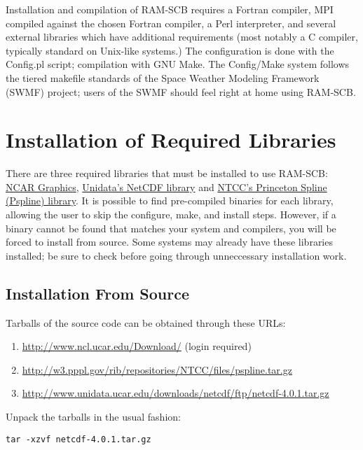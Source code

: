 Installation and compilation of RAM-SCB requires a Fortran compiler, MPI 
compiled against the chosen Fortran compiler, a Perl interpreter, and several 
external libraries which have additional requirements (most notably a C 
compiler, typically standard on Unix-like systems.)  The configuration is 
done with the Config.pl script; compilation with GNU Make.  The Config/Make 
system follows the tiered makefile standards of the Space Weather Modeling 
Framework (SWMF) project; users of the SWMF should feel right at home using
RAM-SCB.

\section{Installation of Required Libraries}

There are three required libraries that must be installed to use RAM-SCB: 
\href{http://ngwww.ucar.edu/}{NCAR Graphics}, 
\href{http://www.unidata.ucar.edu/software/netcdf/}{Unidata's NetCDF library} 
and \href{http://w3.pppl.gov/ntcc/PSPLINE/}{NTCC's Princeton Spline (Pspline) 
library}. It is possible to find pre-compiled binaries for each library, 
allowing the user to skip the configure, make, and install steps.  However, 
if a binary cannot be found that matches your system and compilers, you will 
be forced to install from source.  Some systems may already have these 
libraries installed; be sure to check before going through unneccessary 
installation work.

\subsection{Installation From Source}
 
Tarballs of the source code can be obtained through these URLs:
\begin{enumerate}
\item{\href{http://www.ncl.ucar.edu/Download/}{http://www.ncl.ucar.edu/Download/} (login required)}

\item{\href{http://w3.pppl.gov/rib/repositories/NTCC/files/pspline.tar.gz}{http://w3.pppl.gov/rib/repositories/NTCC/files/pspline.tar.gz}}

\item{\href{http://www.unidata.ucar.edu/downloads/netcdf/ftp/netcdf-4.0.1.tar.gz}{http://www.unidata.ucar.edu/downloads/netcdf/ftp/netcdf-4.0.1.tar.gz}}
\end{enumerate}


Unpack the tarballs in the usual fashion:
\begin{verbatim}
tar -xzvf netcdf-4.0.1.tar.gz
\end{verbatim}

